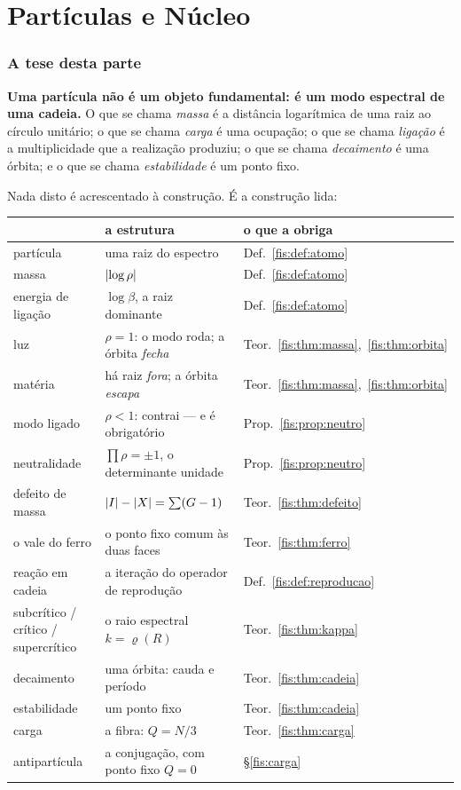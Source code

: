\documentclass[livro.tex]{subfiles}
\begin{document}
\part{Partículas e Núcleo}

\section*{A tese desta parte}\label{fis:tese}

\noindent \textbf{Uma partícula não é um objeto fundamental: é um modo espectral
de uma cadeia.} O que se chama \emph{massa} é a distância logarítmica de uma raiz
ao círculo unitário; o que se chama \emph{carga} é uma ocupação; o que se chama
\emph{ligação} é a multiplicidade que a realização produziu; o que se chama
\emph{decaimento} é uma órbita; e o que se chama \emph{estabilidade} é um ponto
fixo.

\medskip\noindent Nada disto é acrescentado à construção. É a construção lida:

\begin{center}\small
\begin{tabular}{@{}lll@{}}
\toprule
& \textbf{a estrutura} & \textbf{o que a obriga} \\
\midrule
partícula & uma raiz do espectro & Def.~\ref{fis:def:atomo} \\
massa & $\lvert \log\rho\rvert$ & Def.~\ref{fis:def:atomo} \\
energia de ligação & $\log\beta$, a raiz dominante & Def.~\ref{fis:def:atomo} \\
luz & $\rho=1$: o modo roda; a órbita \emph{fecha} & Teor.~\ref{fis:thm:massa},~\ref{fis:thm:orbita} \\
matéria & há raiz \emph{fora}; a órbita \emph{escapa} & Teor.~\ref{fis:thm:massa},~\ref{fis:thm:orbita} \\
modo ligado & $\rho<1$: contrai --- e é obrigatório & Prop.~\ref{fis:prop:neutro} \\
neutralidade & $\prod\rho=\pm1$, o determinante unidade & Prop.~\ref{fis:prop:neutro} \\
defeito de massa & $\lvert I\rvert-\lvert X\rvert=\sum(G-1)$ & Teor.~\ref{fis:thm:defeito} \\
o vale do ferro & o ponto fixo comum às duas faces & Teor.~\ref{fis:thm:ferro} \\
reação em cadeia & a iteração do operador de reprodução & Def.~\ref{fis:def:reproducao} \\
subcrítico / crítico / supercrítico & o raio espectral $k=\varrho(R)$ & Teor.~\ref{fis:thm:kappa} \\
decaimento & uma órbita: cauda e período & Teor.~\ref{fis:thm:cadeia} \\
estabilidade & um ponto fixo & Teor.~\ref{fis:thm:cadeia} \\
carga & a fibra: $Q=N/3$ & Teor.~\ref{fis:thm:carga} \\
antipartícula & a conjugação, com ponto fixo $Q=0$ & §\ref{fis:carga} \\
\bottomrule
\end{tabular}
\end{center}
\end{document}
